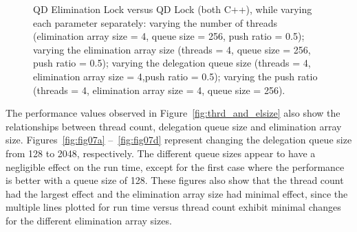 \begin{figure}[]
\caption[]{QD Elimination Lock versus QD Lock (both C++), while varying each parameter separately:  varying the number of threads (elimination array size = 4, queue size = 256, push ratio = 0.5);  varying the elimination array size (threads = 4, queue size = 256, push ratio = 0.5);  varying the delegation queue size (threads = 4, elimination array size = 4,push ratio = 0.5);  varying the push ratio (threads = 4, elimination array size = 4, queue size = 256).}
\label{fig:qdlock}
\end{figure}

The performance values observed in Figure~\ref{fig:thrd_and_elsize} also show the relationships between thread count, delegation queue size and elimination array size. Figures~\ref{fig:fig07a} --~\ref{fig:fig07d} represent changing the delegation queue size from 128 to 2048, respectively. The different queue sizes appear to have a negligible effect on the run time, except for the first case where the performance is better with a queue size of 128. These figures also show that the thread count had the largest effect and the elimination array size had minimal effect, since the multiple lines plotted for run time versus thread count exhibit minimal changes for the different elimination array sizes.

